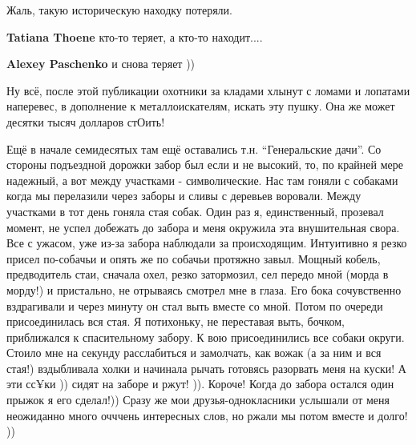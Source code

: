  
 
 
 
 
\zzSecCmt

\begin{itemize} %
Жаль, такую историческую находку потеряли.

\begin{itemize} %
\textbf{Tatiana Thoene} кто-то теряет, а кто-то находит....

\textbf{Alexey Paschenko} и снова теряет ))
\end{itemize} %


Ну всё, после этой публикации охотники за кладами хлынут с ломами и лопатами
наперевес, в дополнение к металлоискателям, искать эту пушку. Она же может
десятки тысяч долларов стОить!


Ещё в начале семидесятых там ещё оставались т.н. \enquote{Генеральские дачи}. Со
стороны подъездной дорожки забор был если и не высокий, то, по крайней мере
надежный, а вот между участками - символические. Нас там гоняли с собаками
когда мы перелазили через заборы и сливы с деревьев воровали. Между участками в
тот день гоняла стая собак. Один раз я, единственный, прозевал момент, не успел
добежать до забора и меня окружила эта внушительная свора. Все с ужасом, уже
из-за забора наблюдали за происходящим. Интуитивно я резко присел по-собачьи и
опять же по собачьи протяжно завыл. Мощный кобель, предводитель стаи, сначала
охел, резко затормозил, сел передо мной (морда в морду!) и пристально, не
отрываясь смотрел мне в глаза. Его бока сочувственно вздрагивали и через минуту
он стал выть вместе со мной. Потом по очереди присоединилась вся стая. Я
потихоньку, не переставая выть, бочком, приближался к спасительному забору. К
вою присоединились все собаки округи. Стоило мне на секунду расслабиться и
замолчать, как вожак (а за ним и вся стая!) вздыбливала холки и начинала рычать
готовясь разорвать меня на куски! А эти сс¥ки )) сидят на заборе и ржут! )).
Короче! Когда до забора остался один прыжок я его сделал!)) Сразу же мои
друзья-однокласники услышали от меня неожиданно много очччень интересных слов,
но ржали мы потом вместе и долго! ))


\end{itemize}
